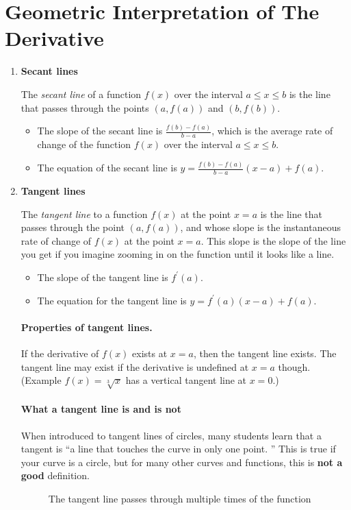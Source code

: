 \section{Geometric Interpretation of The Derivative}
\begin{enumerate}
    \item \textbf{Secant lines}

        The \textit{secant line} of a function $f(x)$ over the interval $a\leq x\leq b$ is the line that passes through the points $(a,f(a))$ and $(b,f(b))$.
        \begin{itemize}
            \item The slope of the secant line is $\frac{f(b)-f(a)}{b-a}$, which is the average rate of change of the function $f(x)$ over the interval $a\leq x\leq b$.
            \item The equation of the secant line is $y=\frac{f(b)-f(a)}{b-a}(x-a)+f(a)$.
        \end{itemize}
    \item \textbf{Tangent lines}

        The \textit{tangent line} to a function $f(x)$ at the point $x=a$ is the line that passes through the point $(a,f(a))$, and whose slope is the instantaneous rate of change of $f(x)$ at the point $x=a$. This slope is the slope of the line you get if you imagine zooming in on the function until it looks like a line.
        \begin{itemize}
            \item The slope of the tangent line is $f^\prime(a)$.
            \item The equation for the tangent line is $y=f^\prime(a)(x-a)+f(a)$.
        \end{itemize}
        \paragraph{Properties of tangent lines.\\} If the derivative of $f(x)$ exists at $x=a$, then the tangent line exists. The tangent line may exist if the derivative is undefined at $x=a$ though. (Example $f(x)=\sqrt[3]{x}$ has a vertical tangent line at $x=0$.)
        \paragraph{What a tangent line is and is not\\} When introduced to tangent lines of circles, many students learn that a tangent is ``a line that touches the curve in only one point. '' This is true if your curve is a circle, but for many other curves and functions, this is \textbf{not a good} definition.
\begin{figure}[H]
    \centering
    \caption{The tangent line passes through multiple times of the function}
\end{figure}
\end{enumerate}

